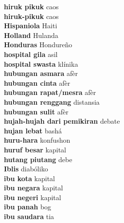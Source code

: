 \textbf{ hiruk pikuk  } caos \\
\textbf{ hiruk-pikuk  } caos \\
\textbf{ Hispaniola  } Haiti \\
\textbf{ Holland  } Hulanda \\
\textbf{ Honduras  } Hondureño \\
\textbf{ hospital gila  } asil \\
\textbf{ hospital swasta  } klínika \\
\textbf{ hubungan asmara  } afèr \\
\textbf{ hubungan cinta  } afèr \\
\textbf{ hubungan rapat/mesra  } afèr \\
\textbf{ hubungan renggang  } distansia \\
\textbf{ hubungan sulit  } afèr \\
\textbf{ hujah-hujah dari pemikiran  } debate \\
\textbf{ hujan lebat  } bashá \\
\textbf{ huru-hara  } konfushon \\
\textbf{ huruf besar  } kapital \\
\textbf{ hutang piutang  } debe \\
\textbf{ Iblis  } diabóliko \\
\textbf{ ibu kota  } kapital \\
\textbf{ ibu negara  } kapital \\
\textbf{ ibu negeri  } kapital \\
\textbf{ ibu panah  } bog \\
\textbf{ ibu saudara  } tia \\
